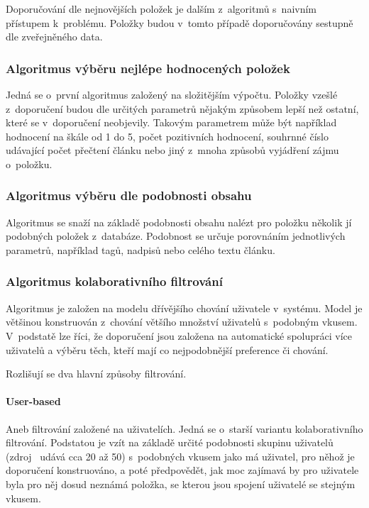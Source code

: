\documentclass[thesis=M,czech]{FITthesis}[2014/05/07]
\begin{document}
Doporučování dle nejnovějších položek je dalším z~algoritmů s~naivním přístupem k~problému. Položky budou v~tomto případě doporučovány sestupně dle zveřejněného data. 

\subsubsection{Algoritmus výběru nejlépe hodnocených položek}

Jedná se o~první algoritmus založený na složitějším výpočtu. Položky vzešlé z~doporučení budou dle určitých parametrů nějakým způsobem lepší než ostatní, které se v~doporučení neobjevily. Takovým parametrem může být například hodnocení na škále od 1 do 5, počet pozitivních hodnocení, souhrnné číslo udávající počet přečtení článku nebo jiný z~mnoha způsobů vyjádření zájmu o~položku. 

\subsubsection{Algoritmus výběru dle podobnosti obsahu}

Algoritmus se snaží na základě podobnosti obsahu nalézt pro položku několik jí podobných položek z~databáze. Podobnost se určuje porovnáním jednotlivých parametrů, například tagů, nadpisů nebo celého textu článku.

\subsubsection{Algoritmus kolaborativního filtrování}

Algoritmus je založen na modelu dřívějšího chování uživatele v~systému. Model je většinou konstruován z~chování většího množství uživatelů s~podobným vkusem. V~podstatě lze říci, že doporučení jsou založena na automatické spolupráci více uživatelů a výběru těch, kteří mají co nejpodobnější preference či chování.

Rozlišují se dva hlavní způsoby filtrování.

\paragraph{User-based}

Aneb filtrování založené na uživatelích. Jedná se o~starší variantu kolaborativního filtrování. Podstatou je vzít na základě určité podobnosti skupinu uživatelů (zdroj~\cite{cf} udává cca 20 až 50) s~podobných vkusem jako má uživatel, pro něhož je doporučení konstruováno, a poté předpovědět, jak moc zajímavá by pro uživatele byla pro něj dosud neznámá položka, se kterou jsou spojení uživatelé se stejným vkusem.
\end{document}
